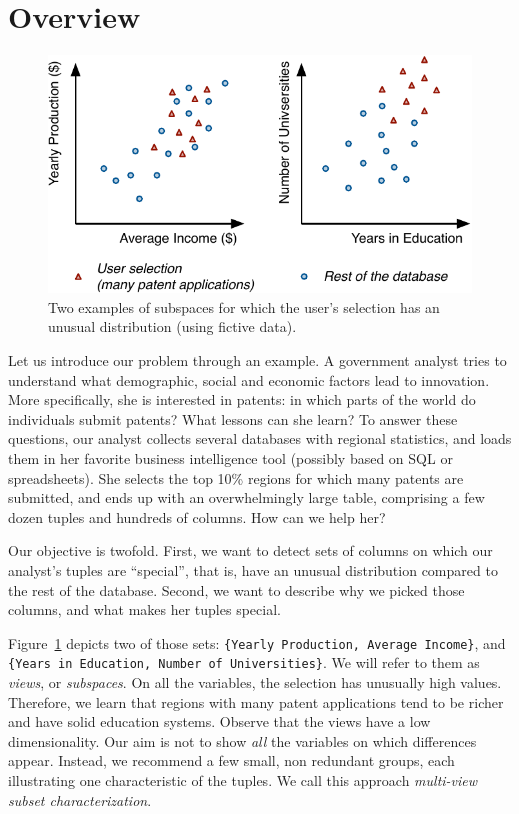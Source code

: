 \section{Overview}
\label{sec:genoverview}
\begin{figure}
  \centering
  \includegraphics[width=0.85\columnwidth]{Figures/Example}
  \caption{Two examples of subspaces for which the user's selection has an
  unusual distribution (using fictive data).}
  \label{pic:example}
\end{figure}
Let us introduce our problem through an example. A government analyst tries to
understand what demographic, social and economic factors lead to innovation.
More specifically, she is interested in patents: in which parts of the world do
individuals submit patents? What lessons can she learn? To answer these
questions, our analyst collects several databases with regional statistics, and
loads them in her favorite business intelligence tool (possibly based on SQL or
spreadsheets). She selects the top 10\% regions for which many patents are
submitted, and ends up with an overwhelmingly large table, comprising a few
dozen tuples and hundreds of columns. How can we help her?
 
Our objective is twofold. First, we want to detect sets of columns on which our
analyst's tuples are ``special'', that is, have an unusual distribution
compared to the rest of the database. Second, we want to describe why we picked
those columns, and what makes her tuples special.

Figure~\ref{pic:example} depicts two of those sets: \texttt{\{Yearly
Production, Average Income\}}, and \texttt{\{Years in Education, Number of
Universities\}}.  We will refer to them as \emph{views}, or \emph{subspaces}.
On all the variables, the selection has unusually high values.
Therefore, we learn that regions with many patent applications tend to be
richer and have solid education systems.  Observe that the views have a low
dimensionality. Our aim is not to show \emph{all} the variables on which
differences appear.  Instead, we recommend a few small, non redundant
groups, each illustrating one characteristic of the tuples. We call this
approach \emph{multi-view subset characterization}.

